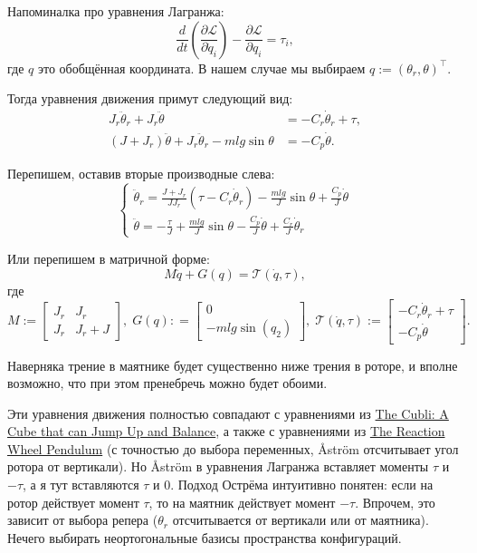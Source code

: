 \documentclass{article}
\begin{document}
Напоминалка про уравнения Лагранжа:
$$
\frac{d}{dt}\left(\frac{\partial\mathcal L}{\partial\dot q_i}\right) - \frac{\partial\mathcal L}{\partial q_i} = \tau_i,
$$
где $q$ это обобщённая координата. В нашем случае мы выбираем $q:=(\theta_r, \theta)^\top$.

Тогда уравнения движения примут следующий вид:
\begin{align*}
J_r\ddot\theta_r + J_r\ddot\theta&= - C_r \dot\theta_r + \tau,\\
(J+J_r)\ddot \theta + J_r\ddot\theta_r - mlg\sin\theta &= - C_p \dot\theta.
\end{align*}

Перепишем, оставив вторые производные слева:
$$
\left\{
\begin{array}{l}
\ddot\theta_r = \frac{J+J_r}{J J_r}(\tau - C_r\dot\theta_r) - \frac{mlg}{J}\sin\theta + \frac{C_p}{J}\dot\theta\\
\ddot\theta   = -\frac{\tau}{J} + \frac{ml g}{J}\sin\theta  - \frac{C_p}{J} \dot\theta + \frac{C_r}{J} \dot\theta_r
\end{array}
\right.
$$

Или перепишем в матричной форме:
\begin{equation} \label{eq:mechModel:generalized}
	M\ddot{q} + G(q) =\mathcal{T}(\dot{q},\tau),
\end{equation}
где
\[
	M := \begin{bmatrix} J_r & J_r \\
						 J_r & J_r+J
		 \end{bmatrix},
	\;
	G(q): = \begin{bmatrix} 0 \\ -mlg \sin(q_2) \end{bmatrix},
	\;
	\mathcal{T}(\dot{q},\tau) := \begin{bmatrix} - C_r \dot\theta_r + \tau \\ - C_p \dot\theta \end{bmatrix}.
\]

Наверняка трение в маятнике будет существенно ниже трения в роторе, и вполне возможно, что при этом пренебречь можно будет обоими. 


{\color{blue} Эти уравнения движения полностью совпадают с уравнениями из \href{https://www.ethz.ch/content/dam/ethz/special-interest/mavt/dynamic-systems-n-control/idsc-dam/Research_DAndrea/Cubli/Cubli_IROS2012.pdf}{The Cubli: A Cube that can Jump Up and Balance}, а также с уравнениями из \href{https://dl.acm.org/citation.cfm?id=3019246}{The Reaction Wheel Pendulum} (с точностью до выбора переменных, Åström отсчитывает угол ротора от вертикали). Но Åström в уравнения Лагранжа вставляет моменты $\tau$ и $-\tau$, а я тут вставляются $\tau$ и 0. Подход Острёма интуитивно понятен: если на ротор действует момент $\tau$, то на маятник действует момент $-\tau$. Впрочем, это зависит от выбора репера ($\theta_r$ отсчитывается от вертикали или от маятника). Нечего выбирать неортогональные базисы пространства конфигураций.}
\end{document}
